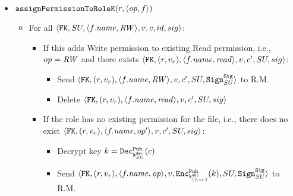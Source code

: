 {\begin{itemize}
        \item \( \assignPermissionToRoleFK \)
        \begin{itemize}
            \item For all \( \pt{SU}{\twoang{\file.\fname}{\opreadwrite}}{v}{c}{id}{sig} \):
            \begin{itemize}
                \item If this adds Write permission to existing Read permission, i.e., \( \operation = \opreadwrite \) and there exists \( \pt{(\role, \rolev)}{\twoang{\file.\fname}{\opread}}{v}{c'}{SU}{sig} \):
                \begin{itemize}
                    \item Send \( \pt{(\role, \rolev)}{\twoang{\file.\fname}{\opreadwrite}}{v}{c'}{SU}{\sig{SU}} \) to R.M.
                    \item Delete \( \pt{(\role, \rolev)}{\twoang{\file.\fname}{\opread}}{v}{c'}{SU}{sig} \)
                \end{itemize} 
                \item If the role has no existing permission for the file, i.e., there does no exist \( \pt{(\role, \rolev)}{\twoang{\file.\fname}{op'}}{v}{c'}{SU}{sig} \):
                \begin{itemize}
                    \item Decrypt key \( k = \decpub{\keydec{SU}}{c} \)
                    \item Send \( \pt{(\role, \rolev)}{\twoang{\file.\fname}{\operation}}{v}{\encpub{\keyencr{\rolev}}{k}}{SU}{\sig{SU}} \) to R.M.
                \end{itemize}
            \end{itemize}
        \end{itemize}


\end{itemize}}
